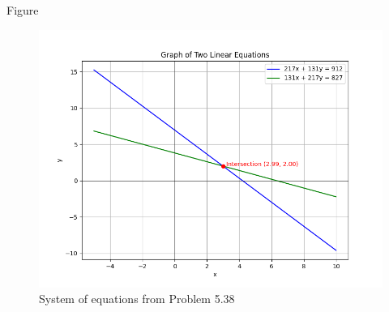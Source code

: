 \documentclass{beamer}
\begin{document}
\begin{frame}{Figure}
\begin{figure}[h!]
\centering
\includegraphics[width=0.85\linewidth]{Figs/Fig1.png}
\caption{System of equations from Problem 5.38}
\end{figure}
\end{frame}
\end{document}
